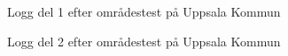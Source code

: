 \documentclass[a4paper,12pt]{article}
\begin{document}
 \begin{figure}[H]
   \centering
   \caption{Logg del 1 efter områdestest på Uppsala Kommun}
   \label{fig:logg_omradestest1}
 \end{figure}


 \begin{figure}[H]
   \centering
   \caption{Logg del 2 efter områdestest på Uppsala Kommun}
   \label{fig:logg_omradestest2}
 \end{figure}
\end{document}
